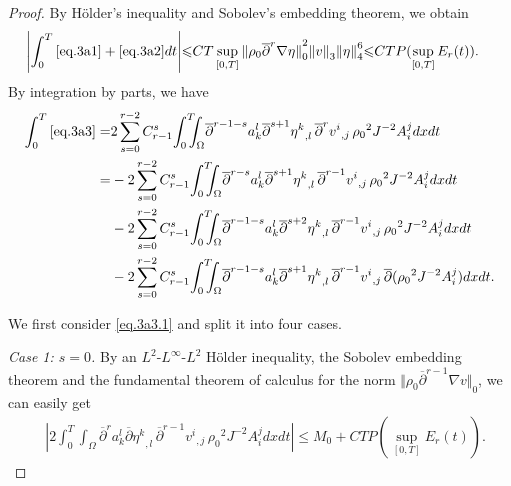 \documentclass[12pt,twoside,reqno]{amsart}
\numberwithin{equation}{section}
\theoremstyle{definition}
\theoremstyle{remark}
\begin{document}
\begin{proof}
By H\"older's inequality and Sobolev's embedding theorem, we obtain
\begin{align*}
  {\left\vert{\int_0^T\eqref{eq.3a1}+\eqref{eq.3a2}dt}\right\vert} {\leqslant} & CT\sup_{[0,T]}{\Vert{{\rho_0} {\overline{\partial}}^r{\nabla}\eta}\Vert}_0^2{\Vert{v}\Vert}_3{\Vert{\eta}\Vert}_4^6
  {\leqslant} CTP(\sup_{[0,T]}E_r(t)).
\end{align*}
By integration by parts,  we have
\begin{align}
\int_0^T\eqref{eq.3a3}=&2\sum_{s=0}^{r-2} C_{r-1}^s{\int_0^T\!\!\!\!\int_\Omega }{\overline{\partial}}^{r-1-s} a_k^l{\overline{\partial}}^{s+1} {{{\eta^k}}_{,{l}}\,}{{{{\overline{\partial}}^r v^i}}_{,{j}}\,}{\rho_0}^2   J^{-2}A^j_i dxdt{\nonumber}\\
  =&-2\sum_{s=0}^{r-2} C_{r-1}^s{\int_0^T\!\!\!\!\int_\Omega }{\overline{\partial}}^{r-s} a_k^l{\overline{\partial}}^{s+1} {{{\eta^k}}_{,{l}}\,}{{{{\overline{\partial}}^{r-1} v^i}}_{,{j}}\,}{\rho_0}^2 J^{-2}A^j_idxdt\label{eq.3a3.1}\\
  &-2\sum_{s=0}^{r-2} C_{r-1}^s{\int_0^T\!\!\!\!\int_\Omega }{\overline{\partial}}^{r-1-s} a_k^l{\overline{\partial}}^{s+2} {{{\eta^k}}_{,{l}}\,}{{{{\overline{\partial}}^{r-1} v^i}}_{,{j}}\,}{\rho_0}^2 J^{-2}A^j_idxdt \label{eq.3a3.2}\\
  &-2\sum_{s=0}^{r-2} C_{r-1}^s{\int_0^T\!\!\!\!\int_\Omega }{\overline{\partial}}^{r-1-s} a_k^l{\overline{\partial}}^{s+1} {{{\eta^k}}_{,{l}}\,}{{{{\overline{\partial}}^{r-1} v^i}}_{,{j}}\,}{\overline{\partial}}({\rho_0}^2 J^{-2}A^j_i)dxdt.\label{eq.3a3.3}
\end{align}

We first consider \eqref{eq.3a3.1} and split it into four cases.

\emph{Case 1: $s=0$.} By an $L^2$-$L^\infty$-$L^2$ H\"older inequality, the Sobolev embedding theorem and the fundamental theorem of calculus for the norm ${\Vert{{\rho_0} {\overline{\partial}}^{r-1} {\nabla} v}\Vert}_0$, we can easily get
\begin{align*}
  &{\left\vert{2{\int_0^T\!\!\!\!\int_\Omega }{\overline{\partial}}^{r} a_k^l{\overline{\partial}} {{{\eta^k}}_{,{l}}\,}{{{{\overline{\partial}}^{r-1} v^i}}_{,{j}}\,}{\rho_0}^2 J^{-2}A^j_idxdt}\right\vert}
  {\leqslant} M_0+CTP(\sup_{[0,T]}E_r(t)).
\end{align*}


\end{proof}
\end{document}
